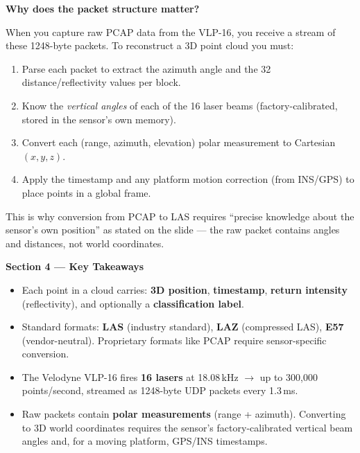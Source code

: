 \documentclass[12pt, a4paper]{article}
\begin{document}
\begin{notebox}
  \textbf{Why does the packet structure matter?}

  When you capture raw PCAP data from the VLP-16, you receive a stream
  of these 1248-byte packets.  To reconstruct a 3D point cloud you must:
  \begin{enumerate}[leftmargin=1.4em,itemsep=2pt]
    \item Parse each packet to extract the azimuth angle and the 32
      distance/reflectivity values per block.
    \item Know the \emph{vertical angles} of each of the 16 laser beams
      (factory-calibrated, stored in the sensor's own memory).
    \item Convert each (range, azimuth, elevation) polar measurement to
      Cartesian $(x, y, z)$.
    \item Apply the timestamp and any platform motion correction
      (from INS/GPS) to place points in a global frame.
  \end{enumerate}
  This is why conversion from PCAP to LAS requires ``precise knowledge
  about the sensor's own position'' as stated on the slide --- the raw
  packet contains angles and distances, not world coordinates.
\end{notebox}

\begin{keybox}
  \textbf{Section 4 --- Key Takeaways}
  \begin{itemize}[leftmargin=1.2em,itemsep=2pt]
    \item Each point in a cloud carries: \textbf{3D position},
      \textbf{timestamp}, \textbf{return intensity} (reflectivity), and
      optionally a \textbf{classification label}.
    \item Standard formats: \textbf{LAS} (industry standard),
      \textbf{LAZ} (compressed LAS), \textbf{E57} (vendor-neutral).
      Proprietary formats like PCAP require sensor-specific conversion.
    \item The Velodyne VLP-16 fires \textbf{16 lasers} at 18.08\,kHz
      $\to$ up to 300,000 points/second, streamed as 1248-byte UDP
      packets every 1.3\,ms.
    \item Raw packets contain \textbf{polar measurements} (range +
      azimuth).  Converting to 3D world coordinates requires the sensor's
      factory-calibrated vertical beam angles and, for a moving platform,
      GPS/INS timestamps.
  \end{itemize}
\end{keybox}
\end{document}
